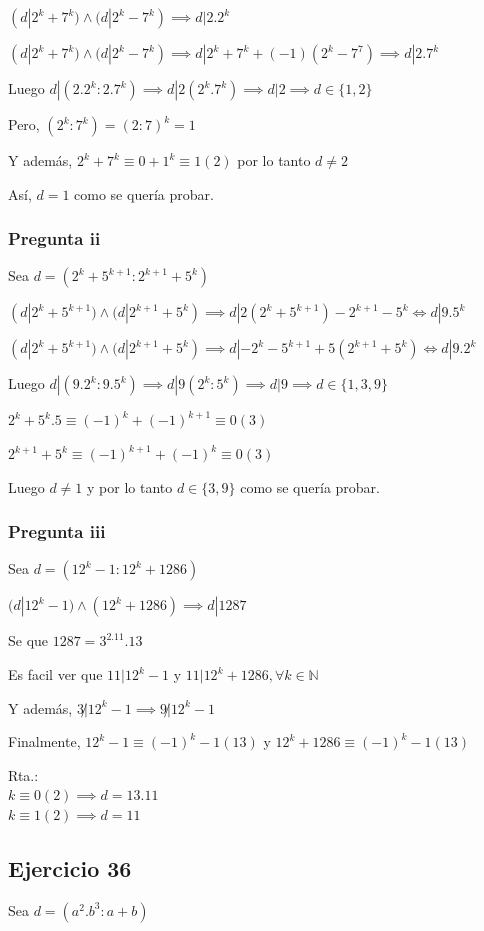 $ (d|2^k + 7^k) \wedge (d|2^k-7^k) \implies d|2.2^k $ 

$ (d|2^k + 7^k) \wedge (d|2^k-7^k) \implies d|2^k+7^k+(-1)(2^k-7^7) \implies d|2.7^k $

Luego $ d|(2.2^k:2.7^k) \implies d|2(2^k.7^k) \implies d|2 \implies d \in \{ 1,2 \}$

Pero, $ (2^k:7^k) = (2:7)^k = 1$

Y además, $ 2^k+7^k \equiv 0 + 1^k \equiv 1(2)$ por lo tanto $ d\neq 2 $

Así, $ d = 1 $ como se quería probar.

\subsubsection{Pregunta ii}
Sea $ d = (2^k+5^{k+1}: 2^{k+1} + 5^k) $

$ (d|2^k + 5^{k+1}) \wedge (d|2^{k+1} + 5^k) \implies d|2(2^k + 5^{k+1}) - 2^{k+1} - 5^k \iff d|9.5^k$

$ (d|2^k + 5^{k+1}) \wedge (d|2^{k+1} + 5^k) \implies d|-2^k - 5^{k+1} + 5(2^{k+1} + 5^k) \iff d|9.2^k$

Luego $ d|(9.2^k:9.5^k) \implies d|9(2^k:5^k) \implies d|9 \implies d \in \{ 1,3,9 \}$

$ 2^k+5^k.5 \equiv (-1)^k + (-1)^{k+1} \equiv 0 (3)$

$ 2^{k+1} + 5^k \equiv (-1)^{k+1} + (-1)^{k} \equiv 0 (3)$

Luego $ d \neq 1 $ y por lo tanto $ d \in \{ 3, 9 \} $ como se quería probar.

\subsubsection{Pregunta iii}
Sea $ d = (12^k-1:12^k+1286) $

$ (d|12^k-1) \wedge (12^k + 1286) \implies d|1287 $

Se que $ 1287 = 3^2.11.13 $

Es facil ver que $ 11|12^k-1 $ y $ 11|12^k+1286 , \forall k \in \mathbb{N} $

Y además, $ 3\not | 12^k-1 \implies 9\not | 12^k-1 $

Finalmente, $ 12^k-1 \equiv (-1)^k - 1(13) $ y $ 12^k+1286 \equiv (-1)^k -1 (13) $

Rta.:\\
$ k \equiv 0(2) \implies d = 13.11 $ \\
$ k \equiv 1(2) \implies d = 11 $ 

\subsection{Ejercicio 36}
Sea $ d = (a^2.b^3:a+b)$

